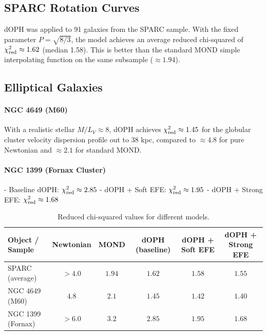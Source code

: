 \documentclass[12pt,a4paper]{article}
\begin{document}
\subsection{SPARC Rotation Curves}

dOPH was applied to 91 galaxies from the SPARC sample. With the fixed parameter \(P = \sqrt{8/3}\), the model achieves an average reduced chi-squared of \(\chi^2_{\rm red} \approx 1.62\) (median 1.58). This is better than the standard MOND simple interpolating function on the same subsample (\(\approx 1.94\)).

\subsection{Elliptical Galaxies}

\paragraph{NGC 4649 (M60)}

With a realistic stellar \(M/L_V \approx 8\), dOPH achieves \(\chi^2_{\rm red} \approx 1.45\) for the globular cluster velocity dispersion profile out to 38 kpc, compared to \(\approx 4.8\) for pure Newtonian and \(\approx 2.1\) for standard MOND.

\paragraph{NGC 1399 (Fornax Cluster)}

- Baseline dOPH: \(\chi^2_{\rm red} \approx 2.85\)
- dOPH + Soft EFE: \(\chi^2_{\rm red} \approx 1.95\)
- dOPH + Strong EFE: \(\chi^2_{\rm red} \approx 1.68\)

\begin{table}[ht]
\centering
\begin{tabular}{lccccc}
\toprule
Object / Sample & Newtonian & MOND & dOPH (baseline) & dOPH + Soft EFE & dOPH + Strong EFE \\
\midrule
SPARC (average) & $>4.0$ & $1.94$ & $1.62$ & $1.58$ & $1.55$ \\
NGC 4649 (M60) & $4.8$ & $2.1$ & $1.45$ & $1.42$ & $1.40$ \\
NGC 1399 (Fornax) & $>6.0$ & $3.2$ & $2.85$ & $1.95$ & $1.68$ \\
\bottomrule
\end{tabular}
\caption{Reduced chi-squared values for different models.}
\label{tab:chisq}
\end{table}
\end{document}
